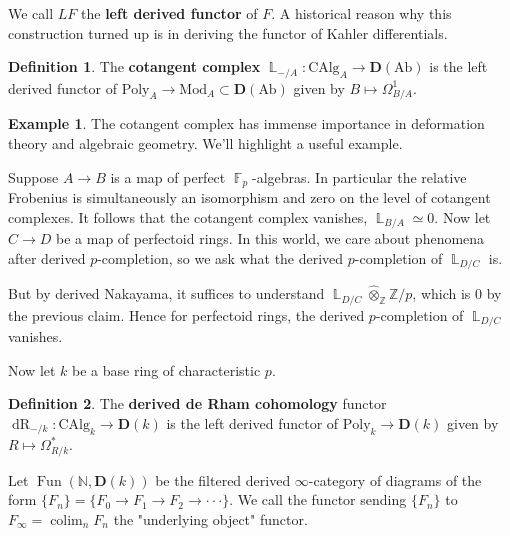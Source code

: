 \documentclass[12pt]{amsproc}
\theoremstyle{definition}
\newtheorem*{definition}{Definition}
\newtheorem*{example}{Example}
\newcommand{\Z}{\mathbb{Z}}
\newcommand{\N}{\mathbb{N}}
\newcommand{\tensor}{\otimes}
\newcommand{\htpyeq}{\simeq}
\newcommand{\ra}{\rightarrow}
\DeclareMathOperator{\colim}{colim}
\DeclareMathOperator{\F}{\mathbb{F}}
\DeclareMathOperator{\Fun}{Fun}
\DeclareMathOperator{\DerivedL}{\mathbb{L}}
\DeclareMathOperator{\dR}{dR}
\newcommand{\ddd}{\cdot\cdot\cdot}
\begin{document}
We call $LF$ the \textbf{left derived functor} of $F$. A historical reason why this construction turned up is in deriving the functor of Kahler differentials.

\begin{definition} The \textbf{cotangent complex} $\DerivedL_{-/A}:\text{CAlg}_A\ra\textbf{D}(\text{Ab})$ is the left derived functor of $\text{Poly}_A\ra\text{Mod}_A\subset\textbf{D}(\text{Ab})$ given by $B\mapsto \Omega^1_{B/A}$.
\end{definition}

\begin{example} The cotangent complex has immense importance in deformation theory and algebraic geometry. We'll highlight a useful example.

Suppose $A\ra B$ is a map of perfect $\F_p$-algebras. In particular the relative Frobenius is simultaneously an isomorphism and zero on the level of cotangent complexes. It follows that the cotangent complex vanishes, $\DerivedL_{B/A}\htpyeq 0$. Now let $C\ra D$ be a map of perfectoid rings. In this world, we care about phenomena after derived $p$-completion, so we ask what the derived $p$-completion of $\DerivedL_{D/C}$ is.

But by derived Nakayama, it suffices to understand $\DerivedL_{D/C}\widehat{\tensor}_{\Z}\Z/p$, which is 0 by the previous claim. Hence for perfectoid rings, the derived $p$-completion of $\DerivedL_{D/C}$ vanishes.
\end{example}

Now let $k$ be a base ring of characteristic $p$. 

\begin{definition} The \textbf{derived de Rham cohomology} functor $\dR_{-/k}:\text{CAlg}_k\ra\textbf{D}(k)$ is the left derived functor of $\text{Poly}_k\ra\textbf{D}(k)$ given by $R\mapsto \Omega^*_{R/k}$.
\end{definition}

Let $\Fun(\N, \textbf{D}(k))$ be the filtered derived $\infty$-category of diagrams of the form $\{F_n\}=\{F_0\ra F_1\ra F_2\ra \ddd\}$. We call the functor sending $\{F_n\}$ to $F_{\infty}=\colim_n F_n$ the "underlying object" functor.
\end{document}
